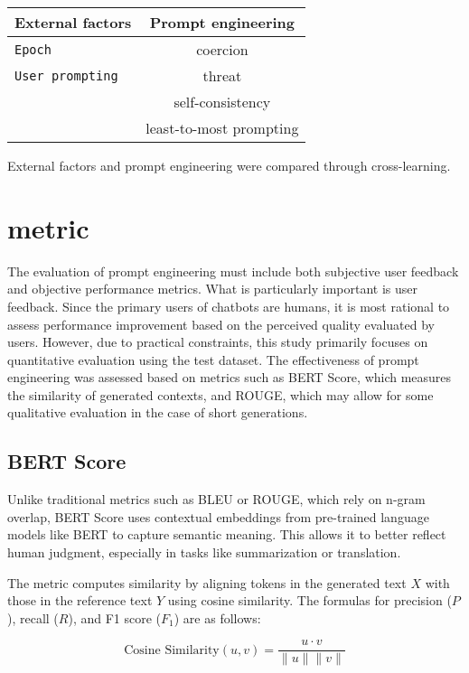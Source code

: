 \documentclass[11pt]{article}
\begin{document}
\centering
\begin{tabular}{lc}
\hline
\textbf{External factors} & \textbf{Prompt engineering}\\
\hline
\verb|Epoch| & {coercion} \\
\verb|User prompting| & {threat} \\
\verb|| & {self-consistency} \\ 
\verb|| & {least-to-most prompting} \\\hline
\end{tabular}

\vspace{0.5em} %
{\footnotesize External factors and prompt engineering were compared through cross-learning.}

\section{metric}

The evaluation of prompt engineering must include both subjective user feedback and objective performance metrics. What is particularly important is user feedback. Since the primary users of chatbots are humans, it is most rational to assess performance improvement based on the perceived quality evaluated by users. However, due to practical constraints, this study primarily focuses on quantitative evaluation using the test dataset. The effectiveness of prompt engineering was assessed based on metrics such as BERT Score, which measures the similarity of generated contexts, and ROUGE, which may allow for some qualitative evaluation in the case of short generations.

\subsection{BERT Score}

Unlike traditional metrics such as BLEU or ROUGE, which rely on n-gram overlap, BERT Score uses contextual embeddings from pre-trained language models like BERT to capture semantic meaning. This allows it to better reflect human judgment, especially in tasks like summarization or translation.

The metric computes similarity by aligning tokens in the generated text $X$ with those in the reference text $Y$ using cosine similarity. The formulas for precision ($P$), recall ($R$), and F1 score ($F_1$) are as follows:

\[
\text{Cosine Similarity}(u, v) = \frac{u \cdot v}{\|u\| \|v\|}
\]
\end{document}
